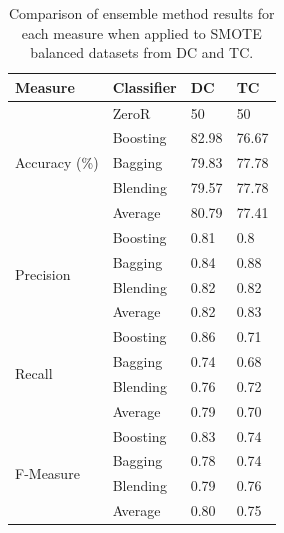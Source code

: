 \begin{table}[h]
\centering
\caption{Comparison of ensemble method results for each measure when applied to SMOTE balanced datasets from DC and TC.}
\label{tbl: smote-compare-dc-tc}
\begin{tabular}{@{}llll@{}}
\toprule
Measure                    & Classifier & DC & TC \\ \midrule
\multirow{5}{*}{Accuracy (\%)}  & ZeroR      & 50                  & 50                    \\
                           & Boosting   & 82.98               & 76.67                 \\
                           & Bagging    & 79.83               & 77.78                 \\
                           & Blending   & 79.57               & 77.78                 \\
                           & Average    & 80.79               & 77.41                 \\ \midrule
\multirow{4}{*}{Precision} & Boosting   & 0.81                & 0.8                   \\
                           & Bagging    & 0.84                & 0.88                  \\
                           & Blending   & 0.82                & 0.82                  \\
                           & Average    & 0.82                & 0.83                  \\ \midrule
\multirow{4}{*}{Recall}    & Boosting   & 0.86                & 0.71                  \\
                           & Bagging    & 0.74                & 0.68                  \\
                           & Blending   & 0.76                & 0.72                  \\
                           & Average    & 0.79                & 0.70                  \\ \midrule
\multirow{4}{*}{F-Measure} & Boosting   & 0.83                & 0.74                  \\
                           & Bagging    & 0.78                & 0.74                  \\
                           & Blending   & 0.79                & 0.76                  \\
                           & Average    & 0.80                & 0.75                  \\ \midrule

\end{tabular}
\end{table}
